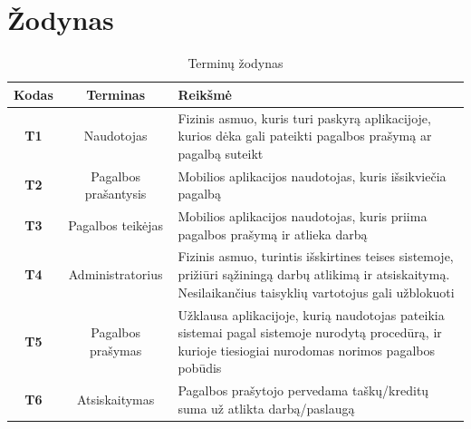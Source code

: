 \documentclass{VUMIFPSbakalaurinis}
\begin{document}
\section{Žodynas}
\begin{table}[H]\footnotesize
	\centering
	\caption{Terminų žodynas}
	{
	\setlength{\arrayrulewidth}{0.25mm}
	{\begin{tabular}{|c|c|m{11.5cm}|} \hline
		Kodas & Terminas & Reikšmė \\
		\hline
		\textbf{T1} & Naudotojas & Fizinis asmuo, kuris turi paskyrą aplikacijoje, kurios dėka gali pateikti pagalbos prašymą ar pagalbą suteikt \\
		\textbf{T2} & Pagalbos prašantysis & Mobilios aplikacijos naudotojas, kuris išsikviečia pagalbą \\
		\textbf{T3} & Pagalbos teikėjas & Mobilios aplikacijos naudotojas, kuris  priima pagalbos prašymą ir atlieka darbą \\
		\textbf{T4} & Administratorius & Fizinis asmuo, turintis išskirtines teises sistemoje, prižiūri sąžiningą darbų atlikimą ir atsiskaitymą. Nesilaikančius taisyklių vartotojus gali užblokuoti \\
		\textbf{T5} & Pagalbos prašymas & Užklausa aplikacijoje, kurią naudotojas pateikia sistemai pagal sistemoje nurodytą procedūrą, ir kurioje tiesiogiai nurodomas norimos pagalbos pobūdis \\
		\textbf{T6} & Atsiskaitymas & Pagalbos prašytojo pervedama taškų/kreditų suma už atlikta darbą/paslaugą \\
		\hline
	\end{tabular}}
	}
	\label{tab:dictionary}
\end{table}
	
\end{document}
